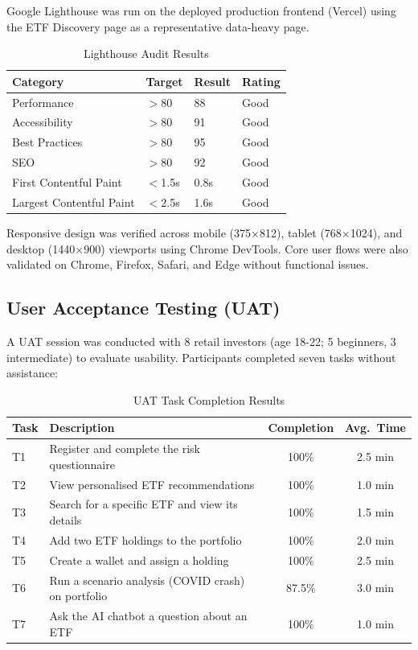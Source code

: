 Google Lighthouse was run on the deployed production frontend (Vercel) using the ETF Discovery page as a representative data-heavy page.

\begin{table}[H]
\centering
\begin{tabular}{llll}
\toprule
\textbf{Category} & \textbf{Target} & \textbf{Result} & \textbf{Rating} \\
\midrule
Performance & $>$80 & 88 & Good \\
Accessibility & $>$80 & 91 & Good \\
Best Practices & $>$80 & 95 & Good \\
SEO & $>$80 & 92 & Good \\
First Contentful Paint & $<$1.5s & 0.8s & Good \\
Largest Contentful Paint & $<$2.5s & 1.6s & Good \\
\bottomrule
\end{tabular}
\caption{Lighthouse Audit Results}
\label{tab:lighthouse}
\end{table}

Responsive design was verified across mobile (375$\times$812), tablet (768$\times$1024), and desktop (1440$\times$900) viewports using Chrome DevTools. Core user flows were also validated on Chrome, Firefox, Safari, and Edge without functional issues.

\subsection{User Acceptance Testing (UAT)}

A UAT session was conducted with 8 retail investors (age 18-22; 5 beginners, 3 intermediate) to evaluate usability. Participants completed seven tasks without assistance:

\begin{table}[H]
\centering
\begin{tabular}{p{0.8cm} p{6.5cm} c c}
\toprule
\textbf{Task} & \textbf{Description} & \textbf{Completion} & \textbf{Avg.\ Time} \\
\midrule
T1 & Register and complete the risk questionnaire & 100\% & 2.5 min \\
T2 & View personalised ETF recommendations & 100\% & 1.0 min \\
T3 & Search for a specific ETF and view its details & 100\% & 1.5 min \\
T4 & Add two ETF holdings to the portfolio & 100\% & 2.0 min \\
T5 & Create a wallet and assign a holding & 100\% & 2.5 min \\
T6 & Run a scenario analysis (COVID crash) on portfolio & 87.5\% & 3.0 min \\
T7 & Ask the AI chatbot a question about an ETF & 100\% & 1.0 min \\
\bottomrule
\end{tabular}
\caption{UAT Task Completion Results}
\label{tab:uat_tasks}
\end{table}

